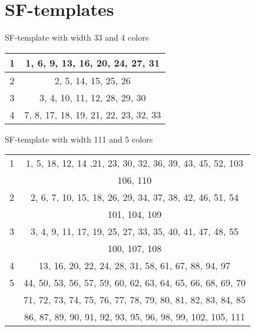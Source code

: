 \appendix


\section{SF-templates}
\renewcommand{\arraystretch}{1}

\begin{center}
SF-template with width 33 and 4 colors \\

\begin{tabular}{|*{2}{c|}}
	\hline
	1 & 1, 6, 9, 13, 16, 20, 24, 27, 31 \\
	\hline
	2 & 2, 5, 14, 15, 25, 26 \\
	\hline
	3 & 3, 4, 10, 11, 12, 28, 29, 30 \\
	\hline
	4 & 7, 8, 17, 18, 19, 21, 22, 23, 32, 33 \\
	\hline
\end{tabular}
\end{center}

\begin{center}
SF-template with width 111 and 5 colors \\

\begin{tabular}{|*{2}{c|}}
	\hline
	1 & 1, 5, 18, 12, 14 ,21, 23, 30, 32, 36, 39, 43, 45, 52, 103 \\
	 & 106, 110 \\
	\hline
	2 & 2, 6, 7, 10, 15, 18, 26, 29, 34, 37, 38, 42, 46, 51, 54 \\
	& 101, 104, 109 \\
	\hline
	3 & 3, 4, 9, 11, 17, 19, 25, 27, 33, 35, 40, 41, 47, 48, 55 \\
	& 100, 107, 108 \\
	\hline
	4 & 13, 16, 20, 22, 24, 28, 31, 58, 61, 67, 88, 94, 97 \\
	\hline
	5 & 44, 50, 53, 56, 57, 59, 60, 62, 63, 64, 65, 66, 68, 69, 70\\
	& 71, 72, 73, 74, 75, 76, 77, 78, 79, 80, 81, 82, 83, 84, 85\\
	& 86, 87, 89, 90, 91, 92, 93, 95, 96, 98, 99, 102, 105, 111 \\
	\hline
\end{tabular}
\end{center}

